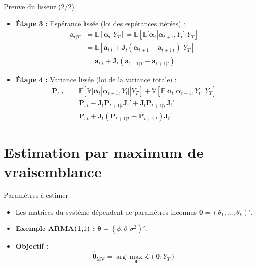 \documentclass[11pt,aspectratio=169]{beamer}
\newcommand{\E}{\mathbb{E}}
\newcommand{\Var}{\mathbb{V}}
\begin{document}
\begin{frame}{Preuve du lisseur (2/2)}

\begin{itemize}

\item \textbf{Étape 3 :} Espérance lissée (loi des espérances itérées) :
  \begin{align*}
  \bm{a}_{t|T} &= \E[\bm{\alpha}_t | Y_T] = \E\!\left[\E[\bm{\alpha}_t | \bm{\alpha}_{t+1}, Y_t] | Y_T\right] \\
  &= \E\!\left[\bm{a}_{t|t} + \bm{J}_t (\bm{\alpha}_{t+1} - \bm{a}_{t+1|t}) | Y_T\right] \\
  &= \bm{a}_{t|t} + \bm{J}_t (\bm{a}_{t+1|T} - \bm{a}_{t+1|t})
  \end{align*}\newline

\item \textbf{Étape 4 :} Variance lissée (loi de la variance totale) :
  \begin{align*}
  \bm{P}_{t|T} &= \E\!\left[\Var[\bm{\alpha}_t | \bm{\alpha}_{t+1}, Y_t] | Y_T\right] + \Var\!\left[\E[\bm{\alpha}_t | \bm{\alpha}_{t+1}, Y_t] | Y_T\right] \\
  &= \bm{P}_{t|t} - \bm{J}_t \bm{P}_{t+1|t} \bm{J}_t' + \bm{J}_t \bm{P}_{t+1|T} \bm{J}_t' \\
  &= \bm{P}_{t|t} + \bm{J}_t(\bm{P}_{t+1|T} - \bm{P}_{t+1|t})\bm{J}_t'
  \end{align*}

\end{itemize}

\end{frame}

\section{Estimation par maximum de vraisemblance}

\begin{frame}{Paramètres à estimer}

\begin{itemize}

\item Les matrices du système dépendent de paramètres inconnus $\bm{\theta} = (\theta_1, \ldots, \theta_k)'$.\newline

\item \textbf{Exemple ARMA(1,1) :} $\bm{\theta} = (\phi, \theta, \sigma^2)'$.\newline

\item \textbf{Objectif :}
  \[
  \hat{\bm{\theta}}_{\mathrm{MV}} = \arg\max_{\bm{\theta}} \mathcal{L}(\bm{\theta}; Y_T)
  \]

\end{itemize}

\end{frame}
\end{document}
